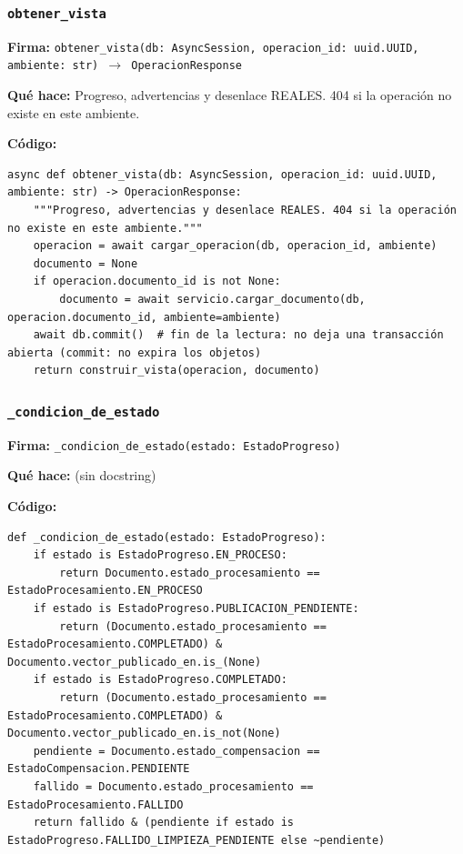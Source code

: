 \documentclass[11pt,a4paper]{article}
\begin{document}
\subsubsection*{\texttt{obtener\_vista}}
\textbf{Firma:} \texttt{obtener\_vista(db: AsyncSession, operacion\_id: uuid.UUID, ambiente: str) $\rightarrow$ OperacionResponse}

\textbf{Qué hace:} Progreso, advertencias y desenlace REALES. 404 si la operación no existe en este ambiente.

\textbf{Código:}
\begin{lstlisting}
async def obtener_vista(db: AsyncSession, operacion_id: uuid.UUID, ambiente: str) -> OperacionResponse:
    """Progreso, advertencias y desenlace REALES. 404 si la operación no existe en este ambiente."""
    operacion = await cargar_operacion(db, operacion_id, ambiente)
    documento = None
    if operacion.documento_id is not None:
        documento = await servicio.cargar_documento(db, operacion.documento_id, ambiente=ambiente)
    await db.commit()  # fin de la lectura: no deja una transacción abierta (commit: no expira los objetos)
    return construir_vista(operacion, documento)
\end{lstlisting}

\subsubsection*{\texttt{\_condicion\_de\_estado}}
\textbf{Firma:} \texttt{\_condicion\_de\_estado(estado: EstadoProgreso)}

\textbf{Qué hace:} (sin docstring)

\textbf{Código:}
\begin{lstlisting}
def _condicion_de_estado(estado: EstadoProgreso):
    if estado is EstadoProgreso.EN_PROCESO:
        return Documento.estado_procesamiento == EstadoProcesamiento.EN_PROCESO
    if estado is EstadoProgreso.PUBLICACION_PENDIENTE:
        return (Documento.estado_procesamiento == EstadoProcesamiento.COMPLETADO) & Documento.vector_publicado_en.is_(None)
    if estado is EstadoProgreso.COMPLETADO:
        return (Documento.estado_procesamiento == EstadoProcesamiento.COMPLETADO) & Documento.vector_publicado_en.is_not(None)
    pendiente = Documento.estado_compensacion == EstadoCompensacion.PENDIENTE
    fallido = Documento.estado_procesamiento == EstadoProcesamiento.FALLIDO
    return fallido & (pendiente if estado is EstadoProgreso.FALLIDO_LIMPIEZA_PENDIENTE else ~pendiente)
\end{lstlisting}
\end{document}
